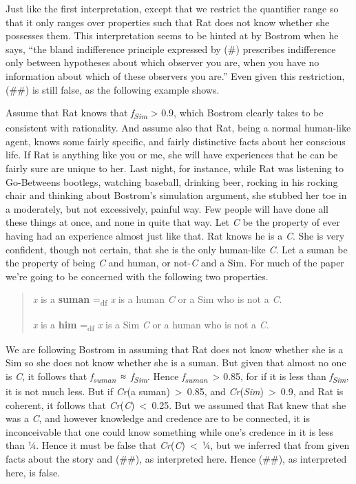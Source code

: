 \documentclass[
  11pt,
  letterpaper,
  DIV=11,
  numbers=noendperiod,
  twoside]{scrartcl}
\begin{document}
Just like the first interpretation, except that we restrict the
quantifier range so that it only ranges over properties such that Rat
does not know whether she possesses them. This interpretation seems to
be hinted at by Bostrom when he says, ``the bland indifference principle
expressed by (\#) prescribes indifference only between hypotheses about
which observer you are, when you have no information about which of
these observers you are.'' Even given this restriction, (\#\#) is still
false, as the following example shows.

Assume that Rat knows that \emph{f\textsubscript{Sim}} \textgreater{}
0.9, which Bostrom clearly takes to be consistent with rationality. And
assume also that Rat, being a normal human-like agent, knows some fairly
specific, and fairly distinctive facts about her conscious life. If Rat
is anything like you or me, she will have experiences that he can be
fairly sure are unique to her. Last night, for instance, while Rat was
listening to Go-Betweens bootlegs, watching baseball, drinking beer,
rocking in his rocking chair and thinking about Bostrom's simulation
argument, she stubbed her toe in a moderately, but not excessively,
painful way. Few people will have done all these things at once, and
none in quite that way. Let \emph{C} be the property of ever having had
an experience almost just like that. Rat knows he is a \emph{C}. She is
very confident, though not certain, that she is the only human-like
\emph{C}. Let a suman be the property of being \emph{C} and human, or
not-\emph{C} and a Sim. For much of the paper we're going to be
concerned with the following two properties.

\begin{quote}
\emph{x} is a \textbf{suman} =\textsubscript{df} \emph{x} is a human
\emph{C} or a Sim who is not a \emph{C}.

\emph{x} is a \textbf{him} =\textsubscript{df} \emph{x} is a Sim
\emph{C} or a human who is not a \emph{C}.
\end{quote}

We are following Bostrom in assuming that Rat does not know whether she
is a Sim so she does not know whether she is a suman. But given that
almost no one is \emph{C}, it follows that
\emph{f\textsubscript{suman}}~≈~\emph{f\textsubscript{Sim}}. Hence
\emph{f\textsubscript{suman}}~\textgreater{} 0.85, for if it is less
than \emph{f\textsubscript{Sim}}, it is not much less. But if
\emph{Cr}(a suman)~\textgreater~0.85, and
\emph{Cr}(\emph{Sim})~\textgreater~0.9, and Rat is coherent, it follows
that \emph{Cr}(\emph{C})~\textless~0.25. But we assumed that Rat knew
that she was a \emph{C}, and however knowledge and credence are to be
connected, it is inconceivable that one could know something while one's
credence in it is less than ¼. Hence it must be false that
\emph{Cr}(\emph{C})~\textless~¼, but we inferred that from given facts
about the story and (\#\#), as interpreted here. Hence (\#\#), as
interpreted here, is false.
\end{document}
